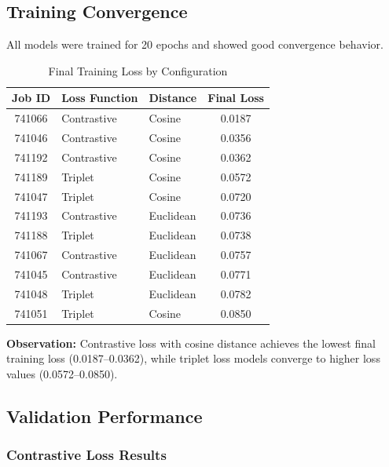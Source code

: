 \documentclass[12pt,a4paper]{article}
\begin{document}
\subsection{Training Convergence}

All models were trained for 20 epochs and showed good convergence behavior.

\begin{table}[H]
\centering
\caption{Final Training Loss by Configuration}
\label{tab:training_loss}
\begin{tabular}{cllc}
\toprule
\textbf{Job ID} & \textbf{Loss Function} & \textbf{Distance} & \textbf{Final Loss} \\
\midrule
741066 & Contrastive & Cosine & 0.0187 \\
741046 & Contrastive & Cosine & 0.0356 \\
741192 & Contrastive & Cosine & 0.0362 \\
741189 & Triplet & Cosine & 0.0572 \\
741047 & Triplet & Cosine & 0.0720 \\
741193 & Contrastive & Euclidean & 0.0736 \\
741188 & Triplet & Euclidean & 0.0738 \\
741067 & Contrastive & Euclidean & 0.0757 \\
741045 & Contrastive & Euclidean & 0.0771 \\
741048 & Triplet & Euclidean & 0.0782 \\
741051 & Triplet & Cosine & 0.0850 \\
\bottomrule
\end{tabular}
\end{table}

\textbf{Observation:} Contrastive loss with cosine distance achieves the lowest final training loss (0.0187--0.0362), while triplet loss models converge to higher loss values (0.0572--0.0850).

\subsection{Validation Performance}

\subsubsection{Contrastive Loss Results}
\end{document}
